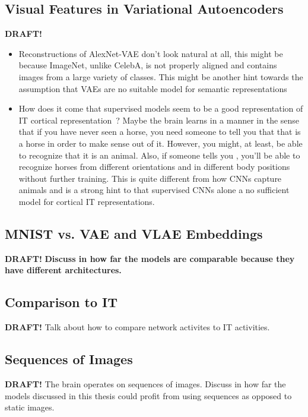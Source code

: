 \documentclass[11pt]{article}
\begin{document}
\subsection{Visual Features in Variational Autoencoders}\label{subsec:discussion_visual_features_in_variational_autoencoders}
\textbf{DRAFT!}
\begin{itemize}
\item Reconstructions of AlexNet-VAE don't look natural at all, this might be because ImageNet, unlike CelebA, is not properly aligned and contains images from a large variety of classes.
This might be another hint towards the assumption that \acp{VAE} are no suitable model for semantic representations
\item How does it come that supervised models seem to be a good representation of \ac{IT} cortical representation~\citep{khaligh2014deep}? Maybe the brain learns in a  manner in the sense that if you have never seen a horse, you need someone to tell you that that is a horse in order to make sense out of it.
However, you might, at least, be able to recognize that it is an animal.
Also, if someone tells you , you'll be able to recognize horses from different orientations and in different body positions without further training.
This is quite different from how \acp{CNN} capture animals and is a strong hint to that supervised \acp{CNN} alone a no sufficient model for cortical IT representations.
\end{itemize}

\subsection{MNIST vs. VAE and VLAE Embeddings}
\textbf{DRAFT!}
\textbf{Discuss in how far the models are comparable because they have different architectures.}

\subsection{Comparison to \ac{IT}}
\textbf{DRAFT!}
Talk about how to compare network activites to IT activities.

\subsection{Sequences of Images}
\textbf{DRAFT!}
The brain operates on sequences of images.
Discuss in how far the models discussed in this thesis could profit from using sequences as opposed to static images.
\end{document}
